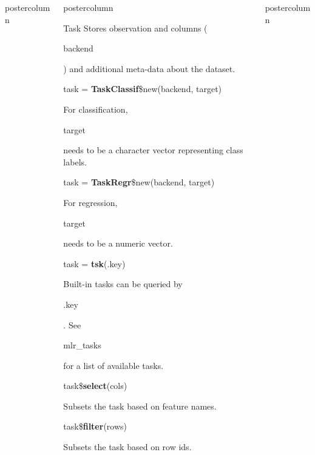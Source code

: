 \documentclass{beamer}
\newlength{\columnheight} %
\newcommand{\codeinline}[1]{\begin{codeboxinline}#1\end{codeboxinline}}
\begin{document}
\begin{frame}[fragile]{}
\begin{columns}
\begin{column}{.245\textwidth}
\begin{beamercolorbox}[center]{postercolumn}
			\end{beamercolorbox}
		\end{column}
		\begin{column}{.245\textwidth}
			\begin{beamercolorbox}[center]{postercolumn}
				\begin{minipage}{.98\textwidth}
					\parbox[t][\columnheight]{\textwidth}{
					\begin{myblock}{Task}
						Stores observation and columns (\codeinline{backend}) and additional
						meta-data about the dataset.
						\vspace{1em}
						\\
						\begin{codebox}
							task = \textbf{TaskClassif}\$new(backend, target)
						\end{codebox}
						For classification, \codeinline{target} needs to be a character vector representing class labels.
						\\
						\begin{codebox}
							task = \textbf{TaskRegr}\$new(backend, target)
						\end{codebox}
						For regression, \codeinline{target} needs to be a numeric vector.
						\\
						\begin{codebox}
							task = \textbf{tsk}(.key)
						\end{codebox}
						Built-in tasks can be queried by \codeinline{.key}.
						See \codeinline{mlr\_tasks} for a list of available tasks.
						\vspace{1em}
						\\
						\begin{codebox}
							task\$\textbf{select}(cols)
						\end{codebox}
						Subsets the task based on feature names.
						\\
						\begin{codebox}
							task\$\textbf{filter}(rows)
						\end{codebox}
						Subsets the task based on row ids.
					\end{myblock}
					\vfill
					}
				\end{minipage}
			\end{beamercolorbox}
		\end{column}
		\begin{column}{.245\textwidth}
			\begin{beamercolorbox}[center]{postercolumn}
				\begin{minipage}{.98\textwidth}

\end{minipage}
\end{beamercolorbox}
\end{column}
\end{columns}
\end{frame}
\end{document}
